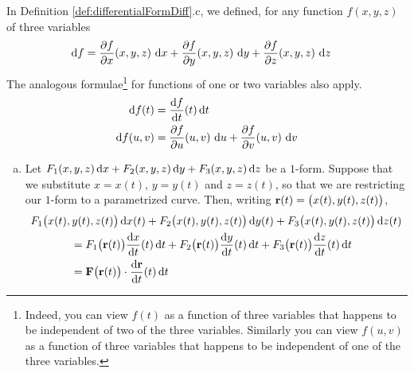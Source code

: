 \begin{eg}\label{eg:diffFormDiffB}
In Definition \ref{def:differentialFormDiff}.c, we defined,
for any function $f(x,y,z)$ of three variables
\begin{align*}
\mathrm{d}f
&=\frac{\partial f}{\partial x}(x,y,z)\ \mathrm{d}x
+\frac{\partial f}{\partial y}(x,y,z)\ \mathrm{d}y
+\frac{\partial f}{\partial z}(x,y,z)\ \mathrm{d}z
\end{align*}
The analogous formulae\footnote{Indeed, you can view $f(t)$ as a function 
of three variables that happens to be independent of two of the three 
variables. Similarly you can view $f(u,v)$  as a function of three 
variables that happens to be independent of one of the three variables.
} for functions of one or two variables also apply.
\begin{align*}
\dee{f(t)} & = \diff{f}{t}(t)\,\dee{t} \\
\dee{f(u,v)}
&=\frac{\partial f}{\partial u}(u,v)\ \dee{u}
+\frac{\partial f}{\partial v}(u,v)\ \dee{v}
\end{align*}

\begin{enumerate}[(a)]
\item 
Let $F_1(x,y,z)\,\mathrm{d}x + F_2(x,y,z)\,\mathrm{d}y + F_3(x,y,z)\,\mathrm{d}z$ 
be a $1$-form. Suppose that we substitute $x=x(t)$, $y=y(t)$ and $z=z(t)$,
so that we are restricting our $1$-form to a parametrized curve.
Then, writing $\mathbf{r}(t) = \big(x(t),y(t),z(t)\big)$,
\begin{align*}
&F_1\big(x(t),y(t),z(t)\big)\,\dee{x(t)} 
  + F_2\big(x(t),y(t),z(t)\big)\,\dee{y(t)} 
  + F_3\big(x(t),y(t),z(t)\big)\,\dee{z(t)} \\
&\hskip0.5in=F_1\big(\vr(t)\big)\diff{x}{t}(t)\,\dee{t}
  + F_2\big(\vr(t)\big)\diff{y}{t}(t)\,\dee{t}
  + F_3\big(\vr(t)\big)\diff{z}{t}(t)\,\dee{t} \\
&\hskip0.5in= \vF\big(\vr(t)\big)\cdot\diff{\vr}{t}(t)\,\dee{t}
\end{align*}



\end{enumerate}
\end{eg}
